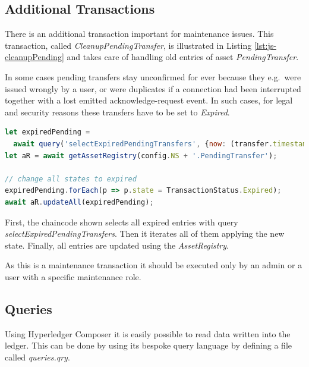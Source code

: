 \subsection{Additional Transactions}

There is an additional transaction important for maintenance issues. This transaction, called \textit{CleanupPendingTransfer}, is illustrated in Listing \ref{lst:js-cleanupPending} and takes care of handling old entries of asset \textit{PendingTransfer}.

In some cases pending transfers stay unconfirmed for ever because they e.g.\ were issued wrongly by a user, or were duplicates if a connection had been interrupted together with a lost emitted acknowledge-request event. In such cases, for legal and security reasons these transfers have to be set to \textit{Expired}.

\begin{center}
\begin{minipage}{0.8\textwidth}
\small
\begin{lstlisting}[language=javascript,firstnumber=1,caption={\bf\small clearDebt JavaScript excerpt}, captionpos=b,label=lst:js-cleanupPending]
let expiredPending =
  await query('selectExpiredPendingTransfers', {now: (transfer.timestamp)});
let aR = await getAssetRegistry(config.NS + '.PendingTransfer');

// change all states to expired
expiredPending.forEach(p => p.state = TransactionStatus.Expired);
await aR.updateAll(expiredPending);
\end{lstlisting}
\end{minipage}
\end{center}

First, the chaincode shown selects all expired entries with query \textit{selectExpiredPendingTransfers}. Then it iterates all of them applying the new state. Finally, all entries are updated using the \textit{AssetRegistry}.

As this is a maintenance transaction it should be executed only by an admin or a user with a specific maintenance role.

\subsection{Queries}
\label{subsec:queries}

Using Hyperledger Composer it is easily possible to read data written into the ledger. This can be done by using its bespoke query language by defining a file called \textit{queries.qry}. 

